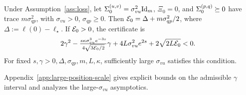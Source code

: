 \begin{corollary}
\label{cor:two-scale-white-window}
Under Assumption~\ref{ass:loss}, let
\(\Sigma^{(u,v)}_0=\sigma_{vu}^2\mathrm{Id}_m\), \(\Xi_0=0\), and
\(\Sigma^{(p,q)}_0\succeq0\) have trace \(m\sigma_{qp}^2\), with
\(\sigma_{vu}>0\), \(\sigma_{qp}\ge0\).
Then \(\mathcal E_0=\Delta+m\sigma_{qp}^2/2\), where
\(\Delta:=\ell(0)-\ell_\star\).
If \(\mathcal E_0>0\), the certificate is
\[
 2\gamma^2-
 \tfrac{s\kappa\sigma_{vu}^3e^{-3s}}
 {4\sqrt{3\mathcal E_0/2}}\gamma
 +4L\sigma_{vu}^2e^{2s}
 +2\sqrt{2L\mathcal E_0}<0.
\]
For fixed \(s,\gamma>0,\Delta,\sigma_{qp},m,L,\kappa\), sufficiently
large \(\sigma_{vu}\) satisfies this condition.
\end{corollary}

Appendix~\ref{app:large-position-scale} gives explicit bounds on the admissible $\gamma$ interval and analyzes the large-$\sigma_{vu}$ asymptotics.

